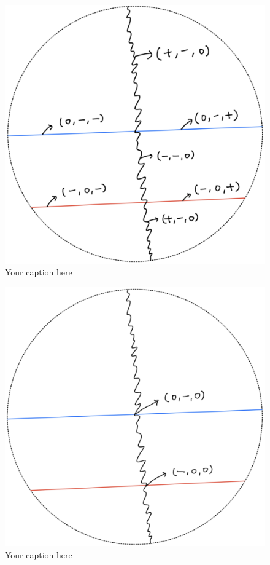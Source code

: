 \begin{figure}[H] 
    \centering
    \includegraphics[scale = 0.95]{diagrams/lemma1/2.png} 
    \caption{Your caption here}
    \label{fig:your-label}
\end{figure}


\begin{figure}[H] 
    \centering
    \includegraphics[scale = 0.95]{diagrams/lemma1/3.png} 
    \caption{Your caption here}
    \label{fig:your-label}
\end{figure}

